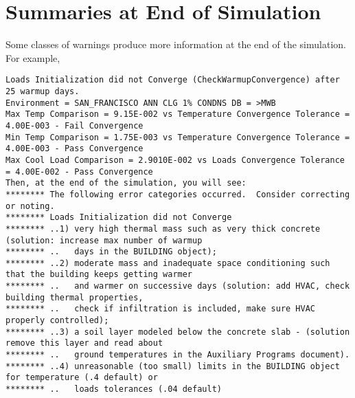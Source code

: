 \section{Summaries at End of Simulation}\label{summaries-at-end-of-simulation}

Some classes of warnings produce more information at the end of the simulation. For example,

\begin{lstlisting}
Loads Initialization did not Converge (CheckWarmupConvergence) after 25 warmup days.
Environment = SAN_FRANCISCO ANN CLG 1% CONDNS DB = >MWB
Max Temp Comparison = 9.15E-002 vs Temperature Convergence Tolerance = 4.00E-003 - Fail Convergence
Min Temp Comparison = 1.75E-003 vs Temperature Convergence Tolerance = 4.00E-003 - Pass Convergence
Max Cool Load Comparison = 2.9010E-002 vs Loads Convergence Tolerance = 4.00E-002 - Pass Convergence
Then, at the end of the simulation, you will see:
******** The following error categories occurred.  Consider correcting or noting.
******** Loads Initialization did not Converge
******** ..1) very high thermal mass such as very thick concrete (solution: increase max number of warmup
******** ..   days in the BUILDING object);
******** ..2) moderate mass and inadequate space conditioning such that the building keeps getting warmer
******** ..   and warmer on successive days (solution: add HVAC, check building thermal properties,
******** ..   check if infiltration is included, make sure HVAC properly controlled);
******** ..3) a soil layer modeled below the concrete slab - (solution remove this layer and read about
******** ..   ground temperatures in the Auxiliary Programs document).
******** ..4) unreasonable (too small) limits in the BUILDING object for temperature (.4 default) or
******** ..   loads tolerances (.04 default)
\end{lstlisting}

